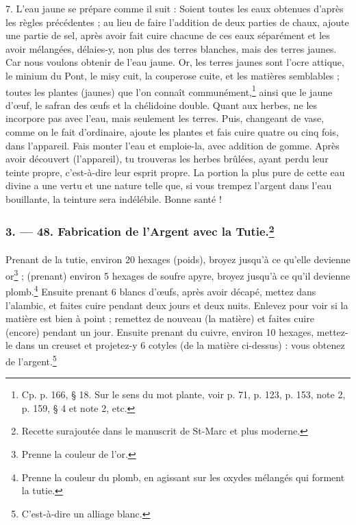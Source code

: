 \documentclass[landscape, a4paper, 11pt, oneside, polutonikogreek, french]{article}
\begin{document}
7. L'eau jaune se prépare comme il suit : Soient toutes les eaux obtenues d'après les règles précédentes ; au lieu de faire l'addition de deux parties de chaux, ajoute une partie de sel, après avoir fait cuire chacune de ces eaux séparément et les avoir mélangées, délaies-y, non plus des terres blanches, mais des terres jaunes. Car nous voulons obtenir de l'eau jaune. Or, les terres jaunes sont l'ocre attique, le minium du Pont, le misy cuit, la couperose cuite, et les matières semblables ; toutes les plantes (jaunes) que l'on connaît communément,\footnote{Cp. p. 166, § 18. Sur le sens du mot plante, voir p. 71, p. 123, p. 153, note 2, p. 159, § 4 et note 2, etc.} ainsi que le jaune d'œuf, le safran des œufs et la chélidoine double. Quant aux herbes, ne les incorpore pas avec l'eau, mais seulement les terres. Puis, changeant de vase, comme on le fait d'ordinaire, ajoute les plantes et fais cuire quatre ou cinq fois, dans l'appareil. Fais monter l'eau et emploie-la, avec addition de gomme. Après avoir découvert (l'appareil), tu trouveras les herbes brûlées, ayant perdu leur teinte propre, c'est-à-dire leur esprit propre. La portion la plus pure de cette eau divine a une vertu et une nature telle que, si vous trempez l'argent dans l'eau bouillante, la teinture sera indélébile. Bonne santé !

\bigskip
\centerline{\EightStarTaper}
\centerline{\EightStarTaper\EightStarTaper}
\bigskip

\subsubsection[3. --- 48. Fabrication de l'Argent avec la Tutie.]{3. --- 48. Fabrication de l'Argent avec la Tutie.\footnote{Recette surajoutée dans le manuscrit de St-Marc et plus moderne.}}
\paragraph{}
Prenant de la tutie, environ 20 hexages (poids), broyez jusqu'à ce qu'elle devienne or\footnote{Prenne la couleur de l'or.} ; (prenant) environ 5 hexages de soufre apyre, broyez jusqu'à ce qu'il devienne plomb.\footnote{Prenne la couleur du plomb, en agissant sur les oxydes mélangés qui forment la tutie.} Ensuite prenant 6 blancs d'œufs, après avoir décapé, mettez dans l'alambic, et faites cuire pendant deux jours et deux nuits. Enlevez pour voir si la matière est bien à point ; remettez de nouveau (la matière) et faites cuire (encore) pendant un jour. Ensuite prenant du cuivre, environ 10 hexages, mettez-le dans un creuset et projetez-y 6 cotyles (de la matière ci-dessus) : vous obtenez de l'argent.\footnote{C'est-à-dire un alliage blanc.}
\end{document}
